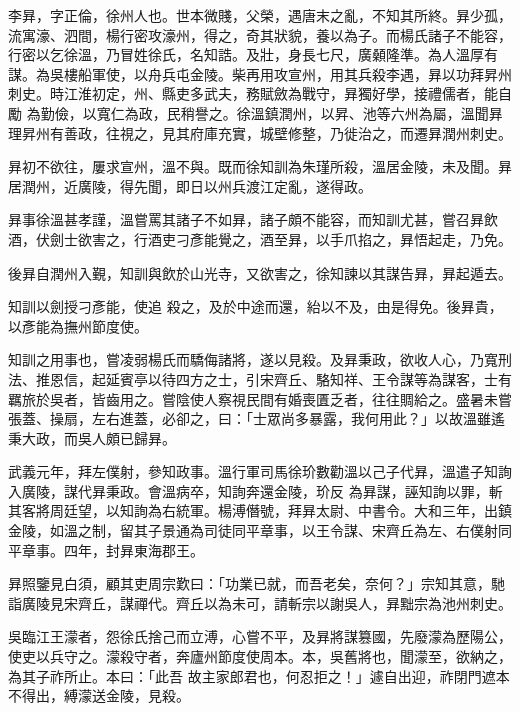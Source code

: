
\begin{pinyinscope}

 李昪，字正倫，徐州人也。世本微賤，父榮，遇唐末之亂，不知其所終。昪少孤，流寓濠、泗間，楊行密攻濠州，得之，奇其狀貌，養以為子。而楊氏諸子不能容，行密以乞徐溫，乃冒姓徐氏，名知誥。及壯，身長七尺，廣顙隆準。為人溫厚有謀。為吳樓船軍使，以舟兵屯金陵。柴再用攻宣州，用其兵殺李遇，昪以功拜昇州刺史。時江淮初定，州、縣吏多武夫，務賦斂為戰守，昪獨好學，接禮儒者，能自勵
 為勤儉，以寬仁為政，民稍譽之。徐溫鎮潤州，以昇、池等六州為屬，溫聞昪理昇州有善政，往視之，見其府庫充實，城壁修整，乃徙治之，而遷昪潤州刺史。



 昪初不欲往，屢求宣州，溫不與。既而徐知訓為朱瑾所殺，溫居金陵，未及聞。昪居潤州，近廣陵，得先聞，即日以州兵渡江定亂，遂得政。



 昪事徐溫甚孝謹，溫嘗罵其諸子不如昪，諸子頗不能容，而知訓尤甚，嘗召昪飲酒，伏劍士欲害之，行酒吏刁彥能覺之，酒至昪，以手爪掐之，昪悟起走，乃免。



 後昪自潤州入覲，知訓與飲於山光寺，又欲害之，徐知諫以其謀告昪，昪起遁去。



 知訓以劍授刁彥能，使追
 殺之，及於中途而還，紿以不及，由是得免。後昪貴，以彥能為撫州節度使。



 知訓之用事也，嘗凌弱楊氏而驕侮諸將，遂以見殺。及昪秉政，欲收人心，乃寬刑法、推恩信，起延賓亭以待四方之士，引宋齊丘、駱知祥、王令謀等為謀客，士有羈旅於吳者，皆齒用之。嘗陰使人察視民間有婚喪匱乏者，往往賙給之。盛暑未嘗張蓋、操扇，左右進蓋，必卻之，曰：「士眾尚多暴露，我何用此？」以故溫雖遙秉大政，而吳人頗已歸昪。



 武義元年，拜左僕射，參知政事。溫行軍司馬徐玠數勸溫以己子代昪，溫遣子知詢入廣陵，謀代昪秉政。會溫病卒，知詢奔還金陵，玠反
 為昪謀，誣知詢以罪，斬其客將周廷望，以知詢為右統軍。楊溥僭號，拜昪太尉、中書令。大和三年，出鎮金陵，如溫之制，留其子景通為司徒同平章事，以王令謀、宋齊丘為左、右僕射同平章事。四年，封昪東海郡王。



 昪照鑒見白須，顧其吏周宗歎曰：「功業已就，而吾老矣，奈何？」宗知其意，馳詣廣陵見宋齊丘，謀禪代。齊丘以為未可，請斬宗以謝吳人，昪黜宗為池州刺史。



 吳臨江王濛者，怨徐氏捨己而立溥，心嘗不平，及昪將謀篡國，先廢濛為歷陽公，使吏以兵守之。濛殺守者，奔廬州節度使周本。本，吳舊將也，聞濛至，欲納之，為其子祚所止。本曰：「此吾
 故主家郎君也，何忍拒之！」遽自出迎，祚閉門遮本不得出，縛濛送金陵，見殺。




\end{pinyinscope}
